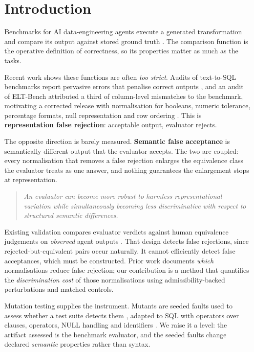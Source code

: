 \documentclass[10pt,conference]{IEEEtran}
\begin{document}
\section{Introduction}

Benchmarks for AI data-engineering agents execute a generated transformation and
compare its output against stored ground truth \cite{eltbench,spider2,bird}. The
comparison function is the operative definition of correctness, so its properties
matter as much as the tasks.

Recent work shows these functions are often \emph{too strict}. Audits of
text-to-SQL benchmarks report pervasive errors that penalise correct outputs
\cite{annotationerrors}, and an audit of ELT-Bench attributed a third of
column-level mismatches to the benchmark, motivating a corrected release with
normalisation for booleans, numeric tolerance, percentage formats, null
representation and row ordering \cite{eltverified}. This is
\textbf{representation false rejection}: acceptable output, evaluator rejects.

The opposite direction is barely measured. \textbf{Semantic false acceptance} is
semantically different output that the evaluator accepts. The two are coupled:
every normalisation that removes a false rejection enlarges the equivalence class
the evaluator treats as one answer, and nothing guarantees the enlargement stops
at representation.

\begin{quote}
\emph{An evaluator can become more robust to harmless representational variation
while simultaneously becoming less discriminative with respect to structured
semantic differences.}
\end{quote}

Existing validation compares evaluator verdicts against human equivalence
judgements on \emph{observed} agent outputs \cite{eltverified}. That design
detects false rejections, since rejected-but-equivalent pairs occur naturally. It
cannot efficiently detect false acceptances, which must be constructed. Prior work
documents \emph{which} normalisations reduce false rejection; our contribution is
a method that quantifies the \emph{discrimination cost} of those normalisations
using admissibility-backed perturbations and matched controls.

Mutation testing supplies the instrument. Mutants are seeded faults used to assess
whether a test suite detects them \cite{jiaharman,mutationsurvey}, adapted to SQL
with operators over clauses, operators, NULL handling and identifiers \cite{tuya}.
We raise it a level: the artifact assessed is the benchmark evaluator, and the
seeded faults change declared \emph{semantic} properties rather than syntax.
\end{document}
